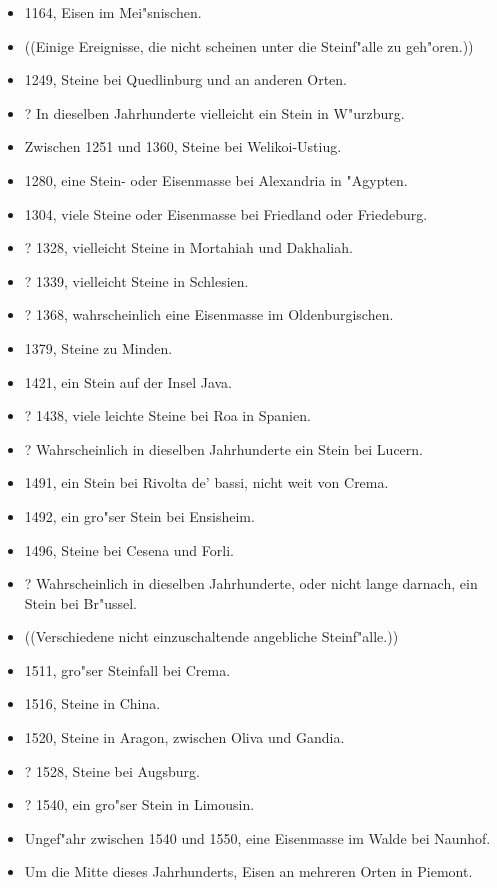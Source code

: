 \documentclass[a4paper, 11pt, oneside, polutonikogreek, german]{article}
\begin{document}
\begin{itemize}
    \item 1164, Eisen im Mei"snischen.
    \item ((Einige Ereignisse, die nicht scheinen unter die Steinf"alle zu geh"oren.))
    \item 1249, Steine bei Quedlinburg und an anderen Orten.
    \item ? In dieselben Jahrhunderte vielleicht ein Stein in W"urzburg.
    \item Zwischen 1251 und 1360, Steine bei Welikoi-Ustiug.
    \item 1280, eine Stein- oder Eisenmasse bei Alexandria in "Agypten.
    \item 1304, viele Steine oder Eisenmasse bei Friedland oder Friedeburg.
    \item ? 1328, vielleicht Steine in Mortahiah und Dakhaliah.
    \item ? 1339, vielleicht Steine in Schlesien.
    \item ? 1368, wahrscheinlich eine Eisenmasse im Oldenburgischen.
    \item 1379, Steine zu Minden.
    \item 1421, ein Stein auf der Insel Java.
    \item ? 1438, viele leichte Steine bei Roa in Spanien.
    \item ? Wahrscheinlich in dieselben Jahrhunderte ein Stein bei Lucern.
    \item 1491, ein Stein bei Rivolta de' bassi, nicht weit von Crema.
    \item 1492, ein gro"ser Stein bei Ensisheim.
    \item 1496, Steine bei Cesena und Forli.
    \item ? Wahrscheinlich in dieselben Jahrhunderte, oder nicht lange darnach, ein Stein bei Br"ussel.
    \item ((Verschiedene nicht einzuschaltende angebliche Steinf"alle.))
    \item 1511, gro"ser Steinfall bei Crema.
    \item 1516, Steine in China.
    \item 1520, Steine in Aragon, zwischen Oliva und Gandia.
    \item ? 1528, Steine bei Augsburg.
    \item ? 1540, ein gro"ser Stein in Limousin.
    \item Ungef"ahr zwischen 1540 und 1550, eine Eisenmasse im Walde bei Naunhof.
    \item Um die Mitte dieses Jahrhunderts, Eisen an mehreren Orten in Piemont.

\end{itemize}
\end{document}
